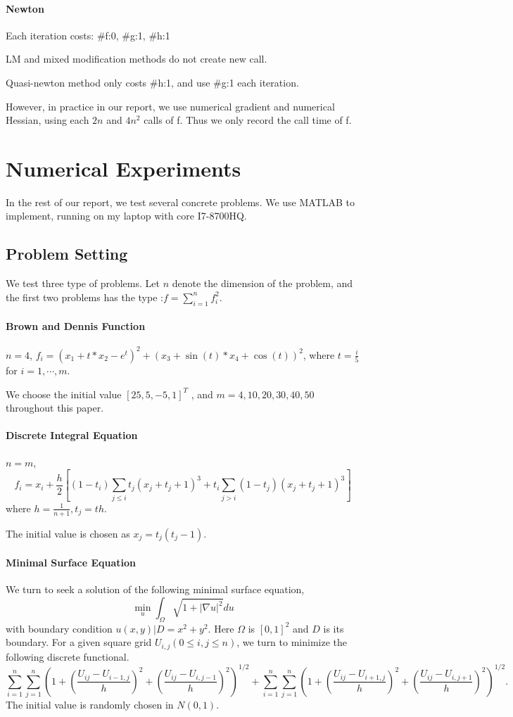 \documentclass{article}
\begin{document}
\paragraph{Newton}
Each iteration costs: \#f:0, \#g:1, \#h:1

LM and mixed modification methods do not create new call. 

Quasi-newton method only costs \#h:1, and use \#g:1 each iteration.

However, in practice in our report, we use numerical gradient and numerical Hessian, using each $2n$ and $4n^2$ calls of f. Thus we only record the call time of f.
\section{Numerical Experiments}
In the rest of our report, we test several concrete problems. We use MATLAB to implement, running on my laptop with core I7-8700HQ.

\subsection{Problem Setting}
We test three type of problems. Let $n$ denote the dimension of the problem, and the first two problems has the type :$f = \sum_{i=1}^n f_i^2$.
\paragraph{Brown and Dennis Function}
$n= 4$, $f_i = (x_1 + t*x_2 - e^t)^2 + (x_3 + \sin(t)*x_4 + \cos(t))^2$, where $t = \frac{i}{5}$ for $i =1,\cdots, m$.

We choose the initial value $[25,5,-5,1]^T$ , and $m = 4,10,20,30,40,50$ throughout this paper.

\paragraph{Discrete Integral Equation}
$n = m$, $$f_i = x_i + \frac{h}{2}[(1-t_i)\sum_{j\le i}t_j(x_j + t_j + 1)^3 + t_i\sum_{j>i}(1-t_j)(x_j + t_j  +1)^3]$$
where $h = \frac{1}{n+1}, t_j = th$.

The initial value is chosen as $x_j = t_j(t_j-1)$.

\paragraph{Minimal Surface Equation}
We turn to seek a solution of the following minimal surface equation, 
$$\min_u{\int_{\Omega}\sqrt{1 + |\nabla u|^2} du}$$
with boundary condition $u(x,y)|D = x^2+y^2$. Here $\Omega$ is $[0,1]^2$ and $D$ is its boundary.
For a given square grid $U_{i,j} (0\le i,j \le n)$, we turn to minimize the following discrete functional.
$$\sum_{i=1}^n \sum_{j=1}^n (1 + (\frac{U_{ij}- U_{i-1,j}}{h})^2 + (\frac{U_{ij}- U_{i,j-1}}{h})^2)^{1/2} + \sum_{i=1}^n \sum_{j=1}^n (1 + (\frac{U_{ij}- U_{i+1,j}}{h})^2 + (\frac{U_{ij}- U_{i,j+1}}{h})^2)^{1/2}.$$
The initial value is randomly chosen in $N(0,1)$.
\end{document}
